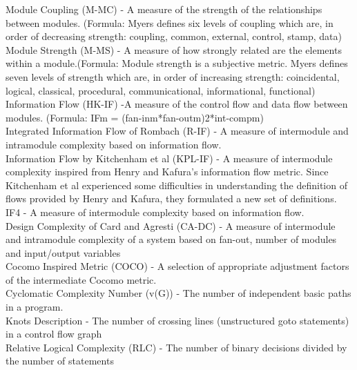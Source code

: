 \documentclass{article}
\begin{document}
Module Coupling (M-MC) - A measure of the strength of the relationships between modules. (Formula: Myers defines six levels of coupling which are, in order of decreasing strength: coupling, common, external, control, stamp, data)\\

Module Strength (M-MS) - A measure of how strongly related are the elements within a module.(Formula: Module  strength  is  a  subjective  metric.    Myers  defines  seven  levels  of  strength  which are, in order of increasing strength: coincidental, logical, classical, procedural, communicational, informational, functional)\\

Information Flow (HK-IF) -A measure of the control flow and data flow between modules. (Formula: IFm = (fan-inm*fan-outm)2*int-compm)\\

Integrated Information Flow of Rombach (R-IF) - A  measure  of  intermodule  and  intramodule  complexity  based  on  information  flow. \\

 Information Flow by Kitchenham et al (KPL-IF) - A   measure   of   intermodule   complexity   inspired   from   Henry   and   Kafura's   information flow metric.  Since Kitchenham et al experienced some difficulties in understanding   the   definition   of   flows   provided   by   Henry   and   Kafura,   they   formulated a new set of definitions.\\
 
  IF4 -  A measure of intermodule complexity based on information flow.\\

Design Complexity of Card and Agresti (CA-DC) - A  measure  of  intermodule  and  intramodule  complexity  of  a  system  based  on  fan-out, number of modules and input/output variables \\

Cocomo Inspired Metric (COCO) - A selection of appropriate adjustment factors of the intermediate Cocomo metric. \\

Cyclomatic Complexity Number (v(G)) -   The number of independent basic paths in a program. \\

Knots Description -  The  number  of  crossing  lines  (unstructured  goto  statements)  in  a  control  flow  graph\\

Relative Logical Complexity (RLC) -  The number of binary decisions divided by the number of statements \\
\end{document}
